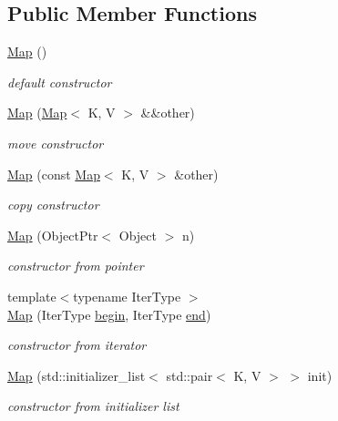\subsection*{Public Member Functions}
\begin{DoxyCompactItemize}
\item 
\hyperlink{classtvm_1_1Map_a3c4b1ad987313584daca3c58724dddf5}{Map} ()
\begin{DoxyCompactList}\small\item\em default constructor \end{DoxyCompactList}\item 
\hyperlink{classtvm_1_1Map_a58ada92864cf1d2cf8cb57444feaed9b}{Map} (\hyperlink{classtvm_1_1Map}{Map}$<$ K, V $>$ \&\&other)
\begin{DoxyCompactList}\small\item\em move constructor \end{DoxyCompactList}\item 
\hyperlink{classtvm_1_1Map_aa552c0ed42255384f95f341871458d7a}{Map} (const \hyperlink{classtvm_1_1Map}{Map}$<$ K, V $>$ \&other)
\begin{DoxyCompactList}\small\item\em copy constructor \end{DoxyCompactList}\item 
\hyperlink{classtvm_1_1Map_ad2f79c81a070cd75a1dc934bafd59916}{Map} (Object\+Ptr$<$ Object $>$ n)
\begin{DoxyCompactList}\small\item\em constructor from pointer \end{DoxyCompactList}\item 
{\footnotesize template$<$typename Iter\+Type $>$ }\\\hyperlink{classtvm_1_1Map_a37cda7c1e644cba140276d8b8690655e}{Map} (Iter\+Type \hyperlink{classtvm_1_1Map_abd05e398b026981426bce7c45c51e0aa}{begin}, Iter\+Type \hyperlink{classtvm_1_1Map_a0b475776d062f8fc32842e054d5674bd}{end})
\begin{DoxyCompactList}\small\item\em constructor from iterator \end{DoxyCompactList}\item 
\hyperlink{classtvm_1_1Map_ae56d036579f1bc05367f511ecb1e95da}{Map} (std\+::initializer\+\_\+list$<$ std\+::pair$<$ K, V $>$ $>$ init)
\begin{DoxyCompactList}\small\item\em constructor from initializer list \end{DoxyCompactList}\item 

\end{DoxyCompactItemize}
